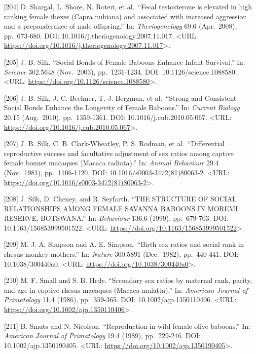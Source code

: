 \documentclass[
]{article}
\begin{document}
{[}204{]} D. Shargal, L. Shore, N. Roteri, et al.~``Fecal testosterone
is elevated in high ranking female ibexes (Capra nubiana) and associated
with increased aggression and a preponderance of male offspring.'' In:
\emph{Theriogenology} 69.6 (Apr.~2008), pp.~673-680. DOI:
10.1016/j.theriogenology.2007.11.017. \textless URL:
\url{https://doi.org/10.1016/j.theriogenology.2007.11.017}\textgreater.

{[}205{]} J. B. Silk. ``Social Bonds of Female Baboons Enhance Infant
Survival.'' In: \emph{Science} 302.5648 (Nov.~2003), pp.~1231-1234. DOI:
10.1126/science.1088580. \textless URL:
\url{https://doi.org/10.1126/science.1088580}\textgreater.

{[}206{]} J. B. Silk, J. C. Beehner, T. J. Bergman, et al.~``Strong and
Consistent Social Bonds Enhance the Longevity of Female Baboons.'' In:
\emph{Current Biology} 20.15 (Aug.~2010), pp.~1359-1361. DOI:
10.1016/j.cub.2010.05.067. \textless URL:
\url{https://doi.org/10.1016/j.cub.2010.05.067}\textgreater.

{[}207{]} J. B. Silk, C. B. Clark-Wheatley, P. S. Rodman, et
al.~``Differential reproductive success and facultative adjustment of
sex ratios among captive female bonnet macaques (Macaca radiata).'' In:
\emph{Animal Behaviour} 29.4 (Nov.~1981), pp.~1106-1120. DOI:
10.1016/s0003-3472(81)80063-2. \textless URL:
\url{https://doi.org/10.1016/s0003-3472(81)80063-2}\textgreater.

{[}208{]} J. Silk, D. Cheney, and R. Seyfarth. ``THE STRUCTURE OF SOCIAL
RELATIONSHIPS AMONG FEMALE SAVANNA BABOONS IN MOREMI RESERVE,
BOTSWANA.'' In: \emph{Behaviour} 136.6 (1999), pp.~679-703. DOI:
10.1163/156853999501522. \textless URL:
\url{https://doi.org/10.1163/156853999501522}\textgreater.

{[}209{]} M. J. A. Simpson and A. E. Simpson. ``Birth sex ratios and
social rank in rhesus monkey mothers.'' In: \emph{Nature} 300.5891
(Dec.~1982), pp.~440-441. DOI: 10.1038/300440a0. \textless URL:
\url{https://doi.org/10.1038/300440a0}\textgreater.

{[}210{]} M. F. Small and S. B. Hrdy. ``Secondary sex ratios by maternal
rank, parity, and age in captive rhesus macaques (Macaca mulatta).'' In:
\emph{American Journal of Primatology} 11.4 (1986), pp.~359-365. DOI:
10.1002/ajp.1350110406. \textless URL:
\url{https://doi.org/10.1002/ajp.1350110406}\textgreater.

{[}211{]} B. Smuts and N. Nicolson. ``Reproduction in wild female olive
baboons.'' In: \emph{American Journal of Primatology} 19.4 (1989),
pp.~229-246. DOI: 10.1002/ajp.1350190405. \textless URL:
\url{https://doi.org/10.1002/ajp.1350190405}\textgreater.
\end{document}
